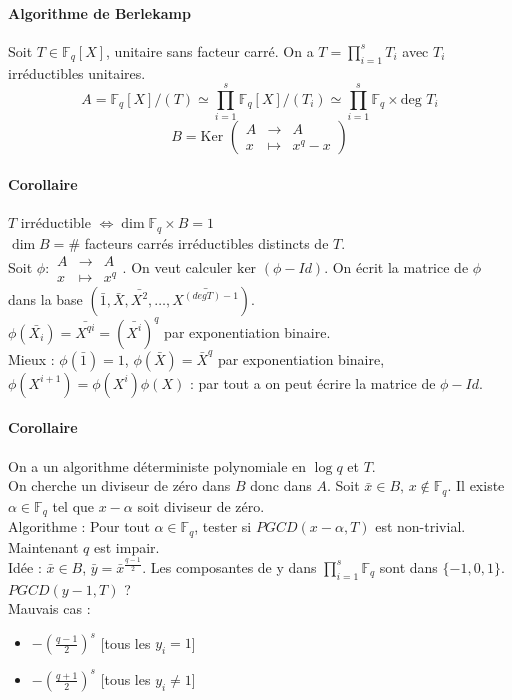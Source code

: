 \documentclass[12pt,a4paper]{report}
\begin{document}
\paragraph{Algorithme de Berlekamp\\}
Soit $T \in \mathbb{F}_q[X]$, unitaire sans facteur carré. On a $T = \prod\limits_{i=1}^{s} T_i $ avec $T_i$ irréductibles unitaires.
$$ A = \mathbb{F}_q[X]/(T) \simeq \prod_{i=1}^s \mathbb{F}_q[X] /(T_i) \simeq \prod_{i=1}^s \mathbb{F}_q \times \mbox{deg }T_i $$
$$ B = \mbox{Ker }\left(\begin{array}{ccc}
A & \longrightarrow & A \\
x & \mapsto & x^q-x \end{array}\right) $$
\paragraph{Corollaire\\}
$T$ irréductible $ \Leftrightarrow \dim \mathbb{F}_q \times B = 1 $\\
$\dim B = \#$ facteurs carrés irréductibles distincts de $T$.\\
Soit $\phi : \begin{array}{ccc}
A & \longrightarrow & A \\
x & \mapsto & x^q \end{array} $. On veut calculer $\mbox{ker }(\phi - Id)$. On écrit la matrice de $\phi$ dans la base $(\bar{1},\bar{X},\bar{X^2}, \ldots, \bar{X^{(deg T) -1}})$.\\
$\phi(\bar{X_i}) = \bar{X^{qi}} = (\bar{X^i})^q$ par exponentiation binaire.\\
Mieux : $\phi(\bar{1}) = 1$, $ \phi(\bar{X}) =  \bar{X}^q $ par exponentiation binaire, $\phi(X^{i+1}) = \phi(X^i)\phi(X) $ : par tout a on peut écrire la matrice de $\phi - Id$.
\paragraph{Corollaire\\}
On a un algorithme déterministe polynomiale en $\log q$ et $T$.\\

On cherche un diviseur de zéro dans $B$ donc dans $A$. Soit $\bar{x} \in B,\, x \not \in \mathbb{F}_q$. Il existe $\alpha \in \mathbb{F}_q $ tel que $x-\alpha$ soit diviseur de zéro.\\
Algorithme : Pour tout $\alpha \in \mathbb{F}_q$, tester si $PGCD(x-\alpha,T)$ est non-trivial.\\
Maintenant $q$ est impair.\\
Idée : $\bar{x} \in B$, $\bar{y} = \bar{x}^{\frac{q-1}{2}}$. Les composantes de y dans $\prod\limits_{i=1}^s \mathbb{F}_q$ sont dans $\{-1,0,1\}$. $PGCD(y-1,T)$ ?\\
Mauvais cas : 
\begin{itemize}
\item $-\left(\frac{q-1}{2}\right)^s$ [tous les $y_i =1 $]
\item $-\left(\frac{q+1}{2}\right)^s$ [tous les $y_i \neq 1$]
\end{itemize}
\end{document}
